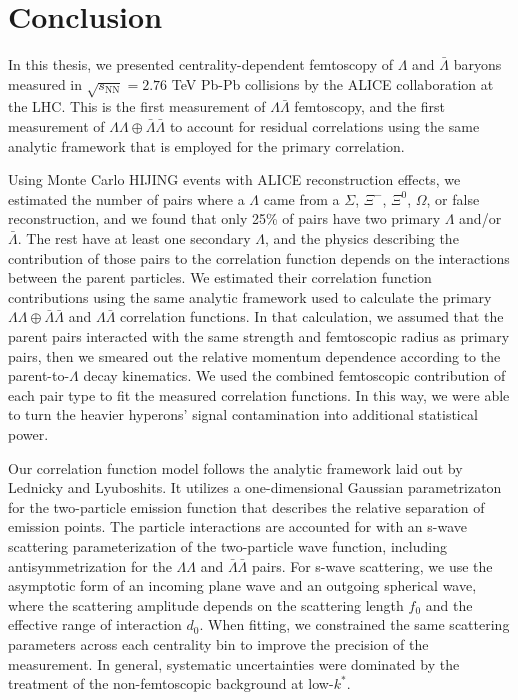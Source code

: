 \chapter{Conclusion}
\label{sec:Conclusion}

In this thesis, we presented centrality-dependent femtoscopy of $\Lambda$ and $\bar{\Lambda}$ baryons measured in $\sqrt{s_\mathrm{NN}} = 2.76$ TeV Pb-Pb collisions by the ALICE collaboration at the LHC.
This is the first measurement of $\Lambda\bar{\Lambda}$ femtoscopy, and the first measurement of $\Lambda\Lambda\oplus\bar{\Lambda}\bar{\Lambda}$ to account for residual correlations using the same analytic framework that is employed for the primary correlation.

Using Monte Carlo HIJING events with ALICE reconstruction effects, we estimated the number of pairs where a $\Lambda$ came from a $\Sigma$, $\Xi^-$, $\Xi^0$, $\Omega$, or false reconstruction, and we found that only 25\% of pairs have two primary $\Lambda$ and/or $\bar{\Lambda}$.
The rest have at least one secondary $\Lambda$, and the physics describing the contribution of those pairs to the correlation function depends on the interactions between the parent particles.
We estimated their correlation function contributions using the same analytic framework used to calculate the primary $\Lambda\Lambda\oplus\bar{\Lambda}\bar{\Lambda}$ and $\Lambda\bar{\Lambda}$ correlation functions.
In that calculation, we assumed that the parent pairs interacted with the same strength and femtoscopic radius as primary pairs, then we smeared out the relative momentum dependence according to the parent-to-$\Lambda$ decay kinematics.
We used the combined femtoscopic contribution of each  pair type to fit the measured correlation functions.
In this way, we were able to turn the heavier hyperons' signal contamination into additional statistical power.

Our correlation function model follows the analytic framework laid out by Lednicky and Lyuboshits.
It utilizes a one-dimensional Gaussian parametrizaton  for the two-particle emission function that describes the relative separation of emission points.
The particle interactions are accounted for with an s-wave scattering parameterization of the two-particle wave function, including antisymmetrization for the $\Lambda\Lambda$ and $\bar{\Lambda}\bar{\Lambda}$ pairs.
For s-wave scattering, we use the asymptotic form of an incoming plane wave and an outgoing spherical wave, where the scattering amplitude depends on the scattering length $f_0$ and the effective range of interaction $d_0$.
When fitting, we constrained the same scattering parameters across each centrality bin to improve the precision of the measurement.
In general, systematic uncertainties were dominated by the treatment of the non-femtoscopic background at low-$k^*$.

